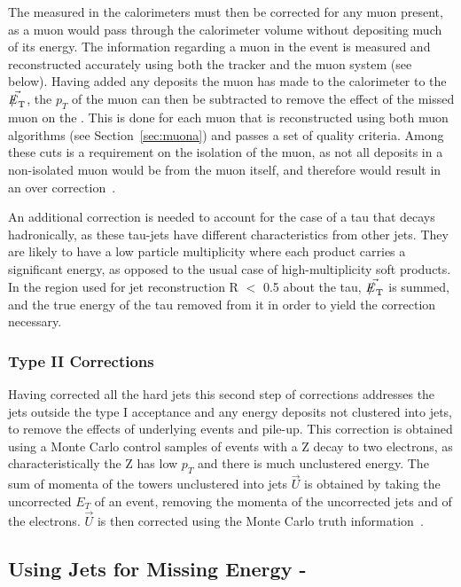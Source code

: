 The \met measured in the calorimeters must then be corrected for any muon present, as a muon would pass through the calorimeter volume without depositing much of its energy. The information regarding a muon in the event is measured and reconstructed accurately using both the tracker and the muon system (see below). Having added any deposits the muon has made to the calorimeter to the $\vec{\met}$, the $p_{T}$ of the muon can then be subtracted to remove the effect of the missed muon on the \met. This is done for each muon that is reconstructed using both muon algorithms (see Section~\ref{sec:muona}) and passes a set of quality criteria. Among these cuts is a requirement on the isolation of the muon, as not all deposits in a non-isolated muon would be from the muon itself, and therefore would result in an over correction~\cite{etmissnote}. 

An additional correction is needed to account for the case of a tau that decays hadronically, as these tau-jets have different characteristics from other jets. They are likely to have a low particle multiplicity where each product carries a significant energy, as opposed to the usual case of high-multiplicity soft products. In the region used for jet reconstruction R $<$ 0.5 about the tau, $\vec{\met}$ is summed, and the true energy of the tau removed from it in order to yield the correction necessary.  

\subsubsection{Type II Corrections}

Having corrected all the hard jets this second step of corrections addresses the jets outside the type I acceptance and any energy deposits not clustered into jets, to remove the effects of underlying events and pile-up. This correction is obtained using a Monte Carlo control samples of events with a Z decay to two electrons, as characteristically the Z has low $p_{T}$ and there is much unclustered energy. The sum of momenta of the towers unclustered into jets $\vec{U}$ is obtained by taking the uncorrected $E_{T}$ of an event, removing the momenta of the uncorrected jets and of the electrons. $\vec{U}$ is then corrected using the Monte Carlo truth information~\cite{JME-10-004}. 


\subsection{Using Jets for Missing Energy - \MHT}

